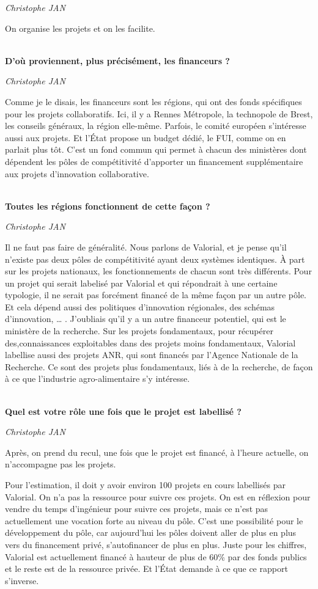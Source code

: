 \documentclass[a4paper,12pt]{report}
\begin{document}
	\emph{Christophe JAN}

    On organise les projets et on les facilite.

	\textbf{\\D’où proviennent, plus précisément, les financeurs ?}

	\emph{Christophe JAN }

    Comme je le disais, les financeurs sont les régions, qui ont des fonds spécifiques pour les projets collaboratifs. Ici, il y a Rennes Métropole, la technopole de Brest, les conseils généraux, la région elle-même. Parfois, le comité européen s’intéresse aussi aux projets. Et l’État propose un budget dédié, le FUI, comme on en parlait plus tôt. C’est un fond commun qui permet à chacun des ministères dont dépendent les pôles de compétitivité d’apporter un financement supplémentaire aux projets d’innovation collaborative.

	\textbf{\\Toutes les régions fonctionnent de cette façon  ?}

	\emph{Christophe JAN }

    Il ne faut pas faire de généralité. Nous parlons de Valorial, et je pense qu’il n’existe pas deux pôles de compétitivité ayant deux systèmes identiques. À part sur les projets nationaux, les fonctionnements de chacun sont très différents. Pour un projet qui serait labelisé par Valorial et qui répondrait à une certaine typologie, il ne serait pas forcément financé de la même façon par un autre pôle. Et cela dépend aussi des politiques d’innovation régionales, des schémas d’innovation, … . J’oubliais qu’il y a un autre financeur potentiel, qui est le ministère de la recherche. Sur les projets fondamentaux, pour récupérer des,connaissances exploitables dans des projets moins fondamentaux, Valorial labellise aussi des projets ANR, qui sont financés par l’Agence Nationale de la Recherche. Ce sont des projets plus fondamentaux, liés à de la recherche, de façon à ce que l’industrie agro-alimentaire s’y intéresse.

	\textbf{\\Quel est votre rôle une fois que le projet est labellisé ?}

	\emph{Christophe JAN}
	
	Après, on prend du recul, une fois que le projet est financé, à l’heure actuelle, on n’accompagne pas les projets.

	Pour l’estimation, il doit y avoir environ 100 projets en cours labellisés par Valorial. On n’a pas la ressource pour suivre ces projets. On est en réflexion pour vendre du temps d’ingénieur pour suivre ces projets, mais ce n’est pas actuellement une vocation forte au niveau du pôle. C’est une possibilité pour le développement du pôle, car aujourd’hui les pôles doivent aller de plus en plus vers du financement privé, s’autofinancer de plus en plus. Juste pour les chiffres, Valorial est actuellement financé à hauteur de plus de 60\% par des fonds publics et le reste est de la ressource privée. Et l’État demande à ce que ce rapport s’inverse.
\end{document}
